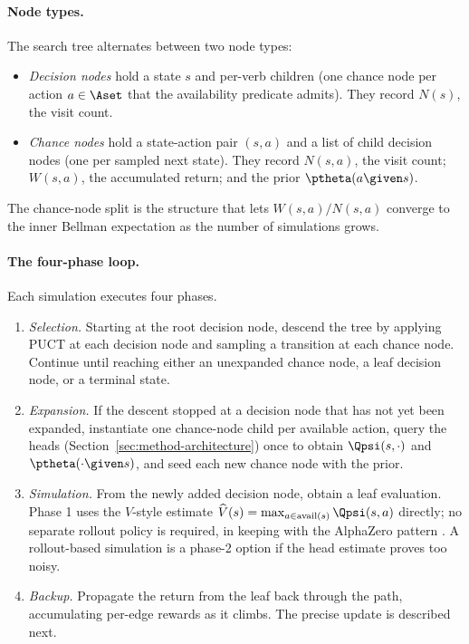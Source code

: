 \paragraph{Node types.}
The search tree alternates between two node types:

\begin{itemize}[leftmargin=*, itemsep=0.2em]
  \item \emph{Decision nodes} hold a state $s$ and per-verb children
        (one chance node per action $a \in \Aset$ that the
        availability predicate admits). They record $N(s)$, the visit
        count.
  \item \emph{Chance nodes} hold a state-action pair $(s, a)$ and a
        list of child decision nodes (one per sampled next state). They
        record $N(s, a)$, the visit count; $W(s, a)$, the accumulated
        return; and the prior $\ptheta(a \given s)$.
\end{itemize}

The chance-node split is the structure that lets $W(s, a) / N(s, a)$
converge to the inner Bellman expectation as the number of simulations
grows.

\paragraph{The four-phase loop.}
Each simulation executes four phases.

\begin{enumerate}[leftmargin=*, itemsep=0.2em]
  \item \emph{Selection.} Starting at the root decision node, descend
        the tree by applying PUCT at each decision node and sampling a
        transition at each chance node. Continue until reaching either
        an unexpanded chance node, a leaf decision node, or a terminal
        state.
  \item \emph{Expansion.} If the descent stopped at a decision node
        that has not yet been expanded, instantiate one chance-node
        child per available action, query the heads
        (Section~\ref{sec:method-architecture}) once to obtain
        $\Qpsi(s, \cdot)$ and $\ptheta(\cdot \given s)$, and seed each
        new chance node with the prior.
  \item \emph{Simulation.} From the newly added decision node, obtain
        a leaf evaluation. Phase 1 uses the $V$-style estimate
        $\widehat{V}(s) = \max_{a \in \mathrm{avail}(s)} \Qpsi(s, a)$
        directly; no separate rollout policy is required, in keeping
        with the AlphaZero pattern \citep{silver2017alphagozero}. A
        rollout-based simulation is a phase-2 option if the head
        estimate proves too noisy.
  \item \emph{Backup.} Propagate the return from the leaf back through
        the path, accumulating per-edge rewards as it climbs. The
        precise update is described next.
\end{enumerate}

